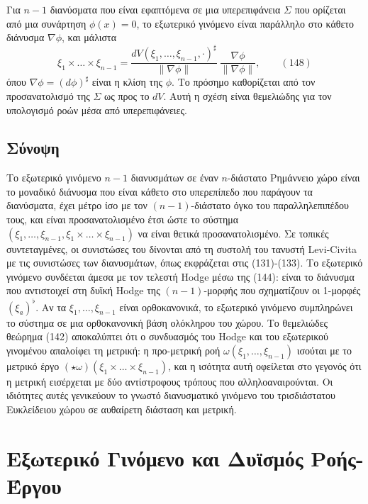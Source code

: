 \documentclass[12pt]{article}
\begin{document}
Για $n-1$ διανύσματα που είναι εφαπτόμενα σε μια υπερεπιφάνεια $\Sigma$ που ορίζεται από μια συνάρτηση $\phi(x) = 0$, το εξωτερικό γινόμενο είναι παράλληλο στο κάθετο διάνυσμα $\nabla \phi$, και μάλιστα
\begin{equation}
\xi_1 \times \dots \times \xi_{n-1} = \frac{dV(\xi_1, \dots, \xi_{n-1}, \cdot)^\sharp}{\|\nabla \phi\|} \ \frac{\nabla \phi}{\|\nabla \phi\|}, \qquad (148)
\end{equation}
όπου $\nabla \phi = (d\phi)^\sharp$ είναι η κλίση της $\phi$. Το πρόσημο καθορίζεται από τον προσανατολισμό της $\Sigma$ ως προς το $dV$. Αυτή η σχέση είναι θεμελιώδης για τον υπολογισμό ροών μέσα από υπερεπιφάνειες.

\subsection{Σύνοψη}

Το εξωτερικό γινόμενο $n-1$ διανυσμάτων σε έναν $n$-διάστατο Ρημάννειο χώρο είναι το μοναδικό διάνυσμα που είναι κάθετο στο υπερεπίπεδο που παράγουν τα διανύσματα, έχει μέτρο ίσο με τον $(n-1)$-διάστατο όγκο του παραλληλεπιπέδου τους, και είναι προσανατολισμένο έτσι ώστε το σύστημα $(\xi_1, \dots, \xi_{n-1}, \xi_1 \times \dots \times \xi_{n-1})$ να είναι θετικά προσανατολισμένο. Σε τοπικές συντεταγμένες, οι συνιστώσες του δίνονται από τη συστολή του τανυστή Levi-Civita με τις συνιστώσες των διανυσμάτων, όπως εκφράζεται στις (131)-(133). Το εξωτερικό γινόμενο συνδέεται άμεσα με τον τελεστή Hodge μέσω της (144): είναι το διάνυσμα που αντιστοιχεί στη δυϊκή Hodge της $(n-1)$-μορφής που σχηματίζουν οι 1-μορφές $(\xi_a)^\flat$. Αν τα $\xi_1, \dots, \xi_{n-1}$ είναι ορθοκανονικά, το εξωτερικό γινόμενο συμπληρώνει το σύστημα σε μια ορθοκανονική βάση ολόκληρου του χώρου. Το θεμελιώδες θεώρημα (142) αποκαλύπτει ότι ο συνδυασμός του Hodge και του εξωτερικού γινομένου απαλοίφει τη μετρική: η προ-μετρική ροή $\omega(\xi_1, \dots, \xi_{n-1})$ ισούται με το μετρικό έργο $(\star \omega)(\xi_1 \times \dots \times \xi_{n-1})$, και η ισότητα αυτή οφείλεται στο γεγονός ότι η μετρική εισέρχεται με δύο αντίστροφους τρόπους που αλληλοαναιρούνται. Οι ιδιότητες αυτές γενικεύουν το γνωστό διανυσματικό γινόμενο του τρισδιάστατου Ευκλείδειου χώρου σε αυθαίρετη διάσταση και μετρική.

\section{Εξωτερικό Γινόμενο και Δυϊσμός Ροής-Έργου}
\end{document}
